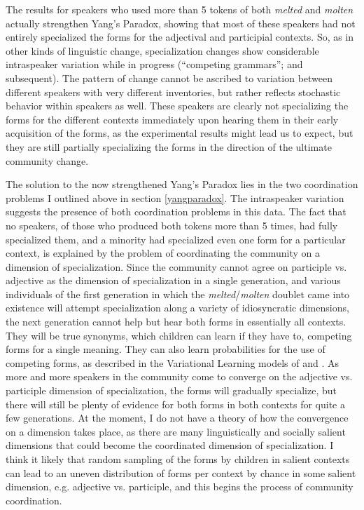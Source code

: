 \documentclass{artikel3}
\begin{document}
The results for speakers who used more than 5 tokens of both \textsl{melted} and \textsl{molten} actually strengthen Yang's Paradox, showing that most of these speakers had not entirely specialized the forms for the adjectival and participial contexts. So, as in other kinds of linguistic change, specialization changes show considerable intraspeaker variation while in progress (``competing grammars''; \citealt{kroch1989} and subsequent). The pattern of change cannot be ascribed to variation between different speakers with very different inventories, but rather reflects stochastic behavior within speakers as well. These speakers are clearly not specializing the forms for the different contexts immediately upon hearing them in their early acquisition of the forms, as the experimental results might lead us to expect, but they are still partially specializing the forms in the direction of the ultimate community change.

The solution to the now strengthened Yang's Paradox lies in the two coordination problems I outlined above in section \ref{yangparadox}. The intraspeaker variation suggests the presence of both coordination problems in this data. The fact that no speakers, of those who produced both tokens more than 5 times, had fully specialized them, and a minority had specialized even one form for a particular context, is explained by the problem of coordinating the community on a dimension of specialization. Since the community cannot agree on participle vs. adjective as the dimension of specialization in a single generation, and various individuals of the first generation in which the \textsl{melted}/\textsl{molten} doublet came into existence will attempt specialization along a variety of idiosyncratic dimensions, the next generation cannot help but hear both forms in essentially all contexts. They will be true synonyms, which children can learn if they have to, competing forms for a single meaning. They can also learn probabilities for the use of competing forms, as described in the Variational Learning models of \citet{yang2000} and \citet{yang2002}. As more and more speakers in the community come to converge on the adjective vs. participle dimension of specialization, the forms will gradually specialize, but there will still be plenty of evidence for both forms in both contexts for quite a few generations. At the moment, I do not have a theory of how the convergence on a dimension takes place, as there are many linguistically and socially salient dimensions that could become the coordinated dimension of specialization. I think it likely that random sampling of the forms by children in salient contexts can lead to an uneven distribution of forms per context by chance in some salient dimension, e.g. adjective vs. participle, and this begins the process of community coordination. 
\end{document}
